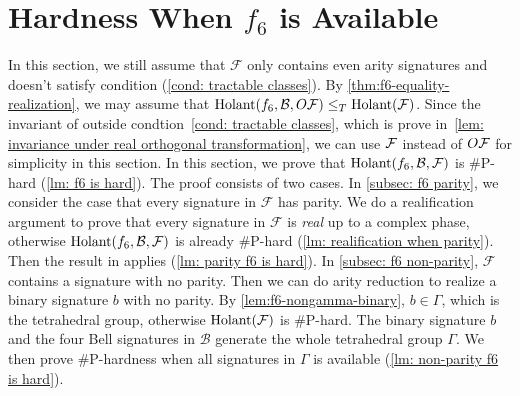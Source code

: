 \section{Hardness When $f_6$ is Available}\label{sec: f6 is hard}

In this section, we still assume that $\mathcal{F}$ only contains even arity signatures and doesn't satisfy condition (\ref{cond: tractable classes}).
By \cref{thm:f6-equality-realization}, we may assume that $\operatorname{Holant}(f_6,\mathcal{B},O\mathcal{F})\le_T \operatorname{Holant}(\mathcal{F})$.  Since the invariant of outside condtion~\eqref{cond: tractable classes}, which is prove in~\cref{lem: invariance under real orthogonal transformation}, we can use $\mathcal{F}$ instead of $O\mathcal{F}$ for simplicity in this section.
In this section, we prove that $\operatorname{Holant}(f_6,\mathcal{B},\mathcal{F})$ is \#P-hard (\cref{lm: f6 is hard}).
The proof consists of two cases.
In \cref{subsec: f6 parity}, we consider the case that every signature in $\mathcal{F}$ has parity.
We do a realification argument to prove that every signature in $\mathcal{F}$ is \emph{real} up to a complex phase, otherwise $\operatorname{Holant}(f_6,\mathcal{B},\mathcal{F})$ is already \#P-hard (\cref{lm: realification when parity}). 
Then the result in \cite{realholant} applies (\cref{lm: parity f6 is hard}).
In \cref{subsec: f6 non-parity}, $\mathcal{F}$ contains a signature with no parity.
Then we can do arity reduction to realize a binary signature $b$ with no parity.
By \cref{lem:f6-nongamma-binary}, $b\in \Gamma$, which is the tetrahedral group, otherwise $\operatorname{Holant}(\mathcal{F})$ is \#P-hard.
The binary signature $b$ and the four Bell signatures in $\mathcal{B}$ generate the whole tetrahedral group $\Gamma$.
We then prove \#P-hardness when all signatures in $\Gamma$ is available (\cref{lm: non-parity f6 is hard}).



